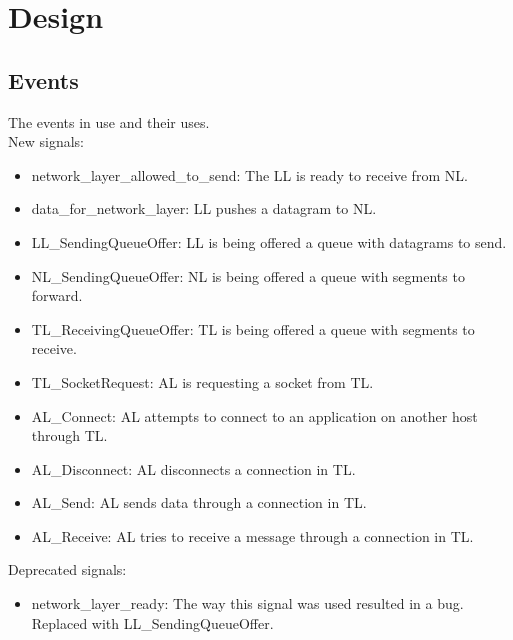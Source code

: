 \section{Design}

%

\subsection{Events}
The events in use and their uses.\\

New signals:
\begin{itemize}
\item network\_layer\_allowed\_to\_send: The LL is ready to receive from NL.
\item data\_for\_network\_layer: LL pushes a datagram to NL.
\item LL\_SendingQueueOffer: LL is being offered a queue with datagrams to send.
\item NL\_SendingQueueOffer: NL is being offered a queue with segments to forward.
\item TL\_ReceivingQueueOffer: TL is being offered a queue with segments to receive.
\item TL\_SocketRequest: AL is requesting a socket from TL.
\item AL\_Connect: AL attempts to connect to an application on another host through TL.
\item AL\_Disconnect: AL disconnects a connection in TL.
\item AL\_Send: AL sends data through a connection in TL.
\item AL\_Receive: AL tries to receive a message through a connection in TL.
\end{itemize}

Deprecated signals:
\begin{itemize}
\item network\_layer\_ready: The way this signal was used resulted in a bug. Replaced with LL\_SendingQueueOffer.
\end{itemize}

